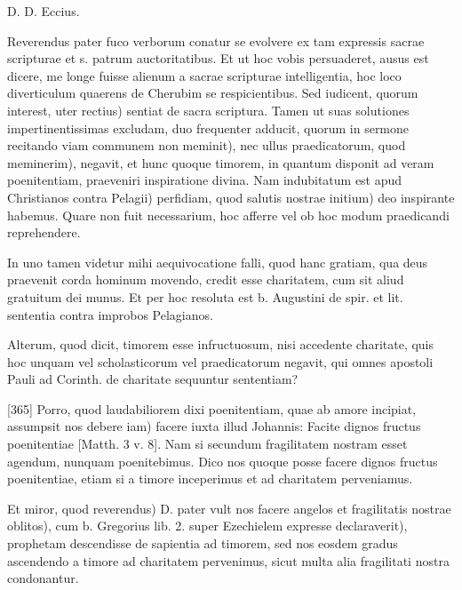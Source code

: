D. D. Eccius.

Reverendus pater fuco verborum conatur se evolvere ex tam expressis sacrae scripturae et s. patrum auctoritatibus. Et ut hoc vobis persuaderet, ausus est dicere, me longe fuisse alienum a sacrae scripturae intelligentia, hoc loco diverticulum quaerens de Cherubim se respicientibus. Sed iudicent, quorum interest, uter rectius) sentiat de sacra scriptura. Tamen ut suas solutiones impertinentissimas excludam, duo frequenter adducit, quorum in sermone recitando viam communem non meminit), nec ullus praedicatorum, quod meminerim), negavit, et hunc quoque timorem, in quantum disponit ad veram poenitentiam, praeveniri inspiratione divina. Nam indubitatum est apud Christianos contra Pelagii) perfidiam, quod salutis nostrae initium) deo inspirante habemus. Quare non fuit necessarium, hoc afferre vel ob hoc modum praedicandi reprehendere.

In uno tamen videtur mihi aequivocatione falli, quod hanc gratiam, qua deus praevenit corda hominum movendo, credit esse charitatem, cum sit aliud gratuitum dei munus. Et per hoc resoluta est b. Augustini de spir. et lit. sententia contra improbos Pelagianos.

Alterum, quod dicit, timorem esse infructuosum, nisi accedente charitate, quis hoc unquam vel scholasticorum vel praedicatorum negavit, qui omnes apostoli Pauli ad Corinth. de charitate sequuntur sententiam?

[365] Porro, quod laudabiliorem dixi poenitentiam, quae ab amore incipiat, assumpsit nos debere iam) facere iuxta illud Johannis: Facite dignos fructus poenitentiae [Matth. 3 v. 8]. Nam si secundum fragilitatem nostram esset agendum, nunquam poenitebimus. Dico nos quoque posse facere dignos fructus poenitentiae, etiam si a timore inceperimus et ad charitatem perveniamus.

Et miror, quod reverendus) D. pater vult nos facere angelos et fragilitatis nostrae oblitos), cum b. Gregorius lib. 2. super Ezechielem expresse declaraverit), prophetam descendisse de sapientia ad timorem, sed nos eosdem gradus ascendendo a timore ad charitatem pervenimus, sicut multa alia fragilitati nostra condonantur.

